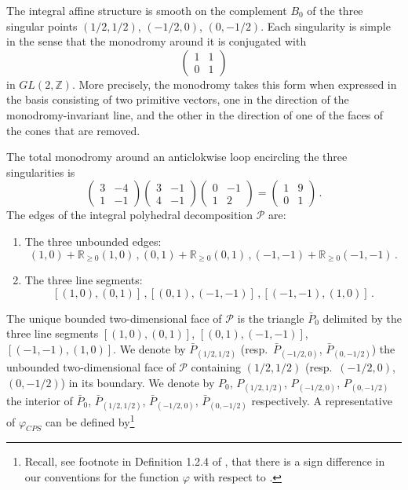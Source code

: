 \documentclass[11pt,letterpaper]{amsart}
\newcommand\R{\mathbb R}
\newcommand\Z{\mathbb Z}
\begin{document}
The integral affine structure is smooth on the complement $B_0$ of the three singular points $(1/2,1/2)$, $(-1/2,0)$, $(0,-1/2)$.
Each singularity is simple in the sense that the monodromy around it is conjugated with \[\begin{pmatrix}
 1 & 1 \\
 0 & 1
\end{pmatrix}\] 
in $GL(2,\Z)$.  More precisely,
the monodromy takes this form when expressed in the basis consisting of two primitive vectors, one in the
direction of the monodromy-invariant line, and the other in the direction of
one of the faces of the cones that are removed.

The total monodromy around an anticlokwise loop encircling the three singularities is \[
\begin{pmatrix}
 3& -4 \\
 1 & -1
\end{pmatrix}
\begin{pmatrix}
 3& -1 \\
 4 & -1
\end{pmatrix}
\begin{pmatrix}
 0 & -1 \\
 1 & 2
\end{pmatrix}
= \begin{pmatrix}
 1& 9 \\
 0 & 1
\end{pmatrix}\,.
\]
The edges of the integral polyhedral decomposition $\mathscr{P}$ are:
\begin{enumerate}
\item The three unbounded edges:
 \[(1,0)+\R_{\geqslant 0}(1,0)\,, (0,1)+\R_{\geqslant 0}(0,1)\,, (-1,-1)+\R_{\geqslant 0} (-1,-1)\,.\]
\item The three line segments:
\[ [(1,0),(0,1)]\,, [(0,1),(-1,-1)]\,,
[(-1,-1),(1,0)]\,.\]
\end{enumerate}
The unique bounded two-dimensional face of $\mathscr{P}$ is the triangle $\bar{P}_0$ 
delimited by the three line segments
$[(1,0),(0,1)]$, $[(0,1),(-1,-1)]$,
$[(-1,-1),(1,0)]$. We denote by $\bar{P}_{(1/2,1/2)}$ (resp.\ $\bar{P}_{(-1/2,0)}$, $\bar{P}_{(0,-1/2)}$) the unbounded two-dimensional face of $\mathscr{P}$ 
containing $(1/2,1/2)$ (resp.\ 
$(-1/2,0)$, $(0,-1/2)$) in its boundary.
We denote by
$P_0$, $P_{(1/2,1/2)}$, $P_{(-1/2,0)}$,
$P_{(0,-1/2)}$ the interior of 
$\bar{P}_0$, $\bar{P}_{(1/2,1/2)}$, $\bar{P}_{(-1/2,0)}$,
$\bar{P}_{(0,-1/2)}$ respectively.
A representative of $\varphi_{CPS}$ can be defined by\footnote{Recall, see footnote in Definition 1.2.4 of \cite{bousseau2019scattering}, that there is a sign difference in our conventions for the function $\varphi$ with respect to \cite{MR2846484, MR2722115, cps, gabele2019tropical}.}
\end{document}
